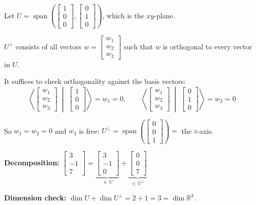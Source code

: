 \documentclass[11pt]{article}
\theoremstyle{definition}
\theoremstyle{plain}
\theoremstyle{remark}
\DeclareMathOperator{\spn}{span}
\begin{document}
\begin{workedexample}[title=\textbf{Worked Example: Orthogonal complement in $\mathbb{R}^3$}]
Let $U = \spn\!\left(\begin{bmatrix}1\\0\\0\end{bmatrix}, \begin{bmatrix}0\\1\\0\end{bmatrix}\right)$, which is the $xy$-plane.

$U^\perp$ consists of all vectors $w = \begin{bmatrix}w_1\\w_2\\w_3\end{bmatrix}$ such that $w$ is orthogonal to every vector in $U$.

It suffices to check orthogonality against the basis vectors:
\[
\left\langle \begin{bmatrix}w_1\\w_2\\w_3\end{bmatrix} \;\middle|\; \begin{bmatrix}1\\0\\0\end{bmatrix} \right\rangle = w_1 = 0, \qquad
\left\langle \begin{bmatrix}w_1\\w_2\\w_3\end{bmatrix} \;\middle|\; \begin{bmatrix}0\\1\\0\end{bmatrix} \right\rangle = w_2 = 0
\]

So $w_1 = w_2 = 0$ and $w_3$ is free: $U^\perp = \spn\!\left(\begin{bmatrix}0\\0\\1\end{bmatrix}\right) =$ the $z$-axis.

\medskip
\textbf{Decomposition:} $\begin{bmatrix}3\\-1\\7\end{bmatrix} = \underbrace{\begin{bmatrix}3\\-1\\0\end{bmatrix}}_{\in\,U} + \underbrace{\begin{bmatrix}0\\0\\7\end{bmatrix}}_{\in\,U^\perp}$

\medskip
\textbf{Dimension check:} $\dim U + \dim U^\perp = 2 + 1 = 3 = \dim \mathbb{R}^3$. \checkmark
\end{workedexample}
\end{document}

